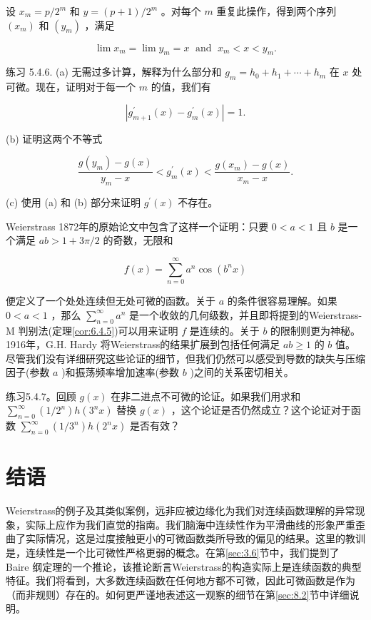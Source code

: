 设 \({x}_{m} = p/{2}^{m}\) 和 \(y = \left( {p + 1}\right) /{2}^{m}\) 。对每个 \(m\) 重复此操作，得到两个序列 \(\left( {x}_{m}\right)\) 和 \(\left( {y}_{m}\right)\) ，满足

\[
\lim {x}_{m} = \lim {y}_{m} = x\;\text{ and }\;{x}_{m} < x < {y}_{m}.
\]

练习 5.4.6. (a) 无需过多计算，解释为什么部分和 \({g}_{m} = {h}_{0} + {h}_{1} + \cdots  + {h}_{m}\) 在 \(x\) 处可微。现在，证明对于每一个 \(m\) 的值，我们有

\[
\left| {{g}_{m + 1}^{\prime }\left( x\right)  - {g}_{m}^{\prime }\left( x\right) }\right|  = 1.
\]

(b) 证明这两个不等式

\[
\frac{g\left( {y}_{m}\right)  - g\left( x\right) }{{y}_{m} - x} < {g}_{m}^{\prime }\left( x\right)  < \frac{g\left( {x}_{m}\right)  - g\left( x\right) }{{x}_{m} - x}.
\]

(c) 使用 (a) 和 (b) 部分来证明 \({g}^{\prime }\left( x\right)\) 不存在。

Weierstrass 1872年的原始论文中包含了这样一个证明：只要 \(0 < a < 1\) 且 \(b\) 是一个满足 \({ab} > 1 + {3\pi }/2\) 的奇数，无限和

\[
f\left( x\right)  = \mathop{\sum }\limits_{{n = 0}}^{\infty }{a}^{n}\cos \left( {{b}^{n}x}\right)
\]

便定义了一个处处连续但无处可微的函数。关于 \(a\) 的条件很容易理解。如果 \(0 < a < 1\) ，那么 \(\mathop{\sum }\limits_{{n = 0}}^{\infty }{a}^{n}\) 是一个收敛的几何级数，并且即将提到的Weierstrass-M 判别法(定理\ref{cor:6.4.5})可以用来证明 \(f\) 是连续的。关于 \(b\) 的限制则更为神秘。1916年，G.H. Hardy 将Weierstrass的结果扩展到包括任何满足 \({ab} \geq  1\) 的 \(b\) 值。尽管我们没有详细研究这些论证的细节，但我们仍然可以感受到导数的缺失与压缩因子(参数 \(a\) )和振荡频率增加速率(参数 \(b\) )之间的关系密切相关。

练习5.4.7。回顾 \(g\left( x\right)\) 在非二进点不可微的论证。如果我们用求和 \(\mathop{\sum }\limits_{{n = 0}}^{\infty }\left( {1/{2}^{n}}\right) h\left( {{3}^{n}x}\right)\) 替换 \(g\left( x\right)\) ，这个论证是否仍然成立？这个论证对于函数 \(\mathop{\sum }\limits_{{n = 0}}^{\infty }\left( {1/{3}^{n}}\right) h\left( {{2}^{n}x}\right)\) 是否有效？

\section{结语}
\label{sec:5.5}
Weierstrass的例子及其类似案例，远非应被边缘化为我们对连续函数理解的异常现象，实际上应作为我们直觉的指南。我们脑海中连续性作为平滑曲线的形象严重歪曲了实际情况，这是过度接触更小的可微函数类所导致的偏见的结果。这里的教训是，连续性是一个比可微性严格更弱的概念。在第\ref{sec:3.6}节中，我们提到了 Baire 纲定理的一个推论，该推论断言Weierstrass的构造实际上是连续函数的典型特征。我们将看到，大多数连续函数在任何地方都不可微，因此可微函数是作为（而非规则）存在的。如何更严谨地表述这一观察的细节在第\ref{sec:8.2}节中详细说明。

